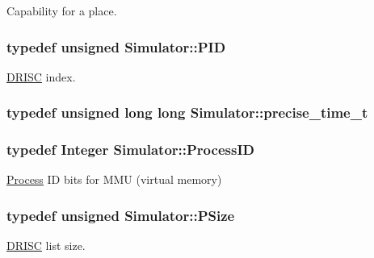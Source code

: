 Capability for a place. 

\hypertarget{namespace_simulator_aa671021151c047ae2da6dce4e6303476}{
\subsubsection[{P\+I\+D}]{\setlength{\rightskip}{0pt plus 5cm}typedef unsigned {\bf Simulator\+::\+P\+I\+D}}}\label{namespace_simulator_aa671021151c047ae2da6dce4e6303476}


\hyperlink{class_simulator_1_1_d_r_i_s_c}{D\+R\+I\+S\+C} index. 

\hypertarget{namespace_simulator_acef09fa68ac870eef8d3706c5ed8f242}{
\subsubsection[{precise\+\_\+time\+\_\+t}]{\setlength{\rightskip}{0pt plus 5cm}typedef unsigned long long {\bf Simulator\+::precise\+\_\+time\+\_\+t}}}\label{namespace_simulator_acef09fa68ac870eef8d3706c5ed8f242}
\hypertarget{namespace_simulator_a62ef2d2c77bd54a16c39881f6266875e}{
\subsubsection[{Process\+I\+D}]{\setlength{\rightskip}{0pt plus 5cm}typedef Integer {\bf Simulator\+::\+Process\+I\+D}}}\label{namespace_simulator_a62ef2d2c77bd54a16c39881f6266875e}


\hyperlink{class_simulator_1_1_process}{Process} I\+D bits for M\+M\+U (virtual memory) 

\hypertarget{namespace_simulator_a4aa07bee2f34beac11abf48a8ccc47c4}{
\subsubsection[{P\+Size}]{\setlength{\rightskip}{0pt plus 5cm}typedef unsigned {\bf Simulator\+::\+P\+Size}}}\label{namespace_simulator_a4aa07bee2f34beac11abf48a8ccc47c4}


\hyperlink{class_simulator_1_1_d_r_i_s_c}{D\+R\+I\+S\+C} list size. 

